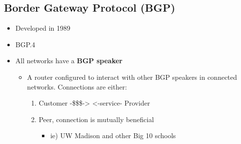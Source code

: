 \documentclass[11pt]{article}
\begin{document}
\subsection{Border Gateway Protocol (BGP)}
\label{sec:orgheadline96}
\begin{itemize}
\item Developed in 1989
\item BGP.4
\item All networks have a \textbf{BGP speaker}
\begin{itemize}
\item A router configured to interact with other BGP speakers in
connected networks. Connections are either:
\begin{enumerate}
\item Customer -\$\$\$-> <-service- Provider
\item Peer, connection is mutually beneficial
\begin{itemize}
\item ie) UW Madison and other Big 10 schools
\end{itemize}
\end{enumerate}
\end{itemize}
\end{itemize}
\end{document}
